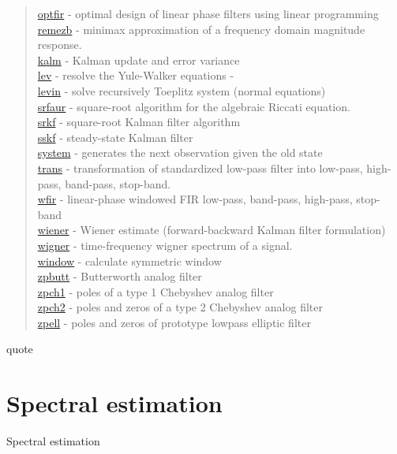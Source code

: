 \begin{quote}
\hyperlink{optfir}{optfir} - optimal design of linear phase filters using linear programming \\
\hyperlink{remezb}{remezb} - minimax approximation of a frequency domain magnitude response. \\
\hyperlink{kalm}{kalm} - Kalman update and error variance \\
\hyperlink{lev}{lev} - resolve the Yule-Walker equations - \\
\hyperlink{levin}{levin} - solve recursively Toeplitz system (normal equations) \\
\hyperlink{srfaur}{srfaur} - square-root algorithm for the algebraic Riccati equation. \\
\hyperlink{srkf}{srkf} - square-root Kalman filter algorithm \\
\hyperlink{sskf}{sskf} - steady-state Kalman filter \\
\hyperlink{system}{system} - generates the next observation given the old state \\
\hyperlink{trans}{trans} - transformation of standardized low-pass filter into low-pass, high-pass, band-pass, stop-band. \\
\hyperlink{wfir}{wfir} - linear-phase windowed FIR low-pass, band-pass, high-pass, stop-band \\
\hyperlink{wiener}{wiener} - Wiener estimate (forward-backward Kalman filter formulation) \\
\hyperlink{wigner}{wigner} - time-frequency wigner spectrum of a signal. \\
\hyperlink{window}{window} - calculate symmetric window \\
\hyperlink{zpbutt}{zpbutt} - Butterworth analog filter \\
\hyperlink{zpch1}{zpch1} - poles of a type 1 Chebyshev analog filter \\
\hyperlink{zpch2}{zpch2} - poles and zeros of a type 2 Chebyshev analog filter \\
\hyperlink{zpell}{zpell} - poles and zeros of prototype lowpass elliptic filter
\end{quote}{quote}

\section*{Spectral estimation}{Spectral estimation} 

